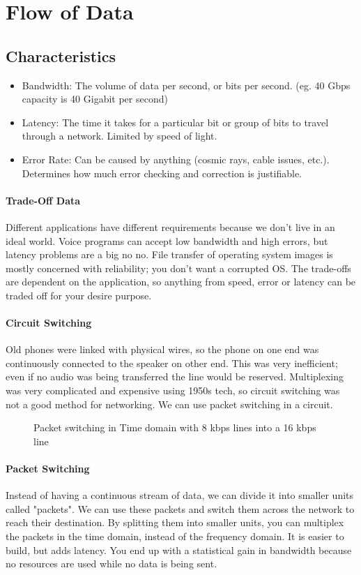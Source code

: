 \section{Flow of Data}
\subsection{Characteristics}
\begin{itemize}
	\item Bandwidth: The volume of data per second, or bits per second. (eg. 40 Gbps capacity is 40 Gigabit per second)
	\item Latency: The time it takes for a particular bit or group of bits to travel through a network. Limited by speed of light.
	\item Error Rate: Can be caused by anything (cosmic rays, cable issues, etc.). Determines how much error checking and correction is justifiable.
\end{itemize}
\paragraph{Trade-Off Data}
Different applications have different requirements because we don't live in an ideal world. Voice programs can accept low bandwidth and high errors, but latency problems are a big no no. File transfer of operating system images is mostly concerned with reliability; you don't want a corrupted OS. The trade-offs are dependent on the application, so anything from speed, error or latency can be traded off for your desire purpose.
\paragraph{Circuit Switching}
Old phones were linked with physical wires, so the phone on one end was continuously connected to the speaker on other end. This was very inefficient; even if no audio was being transferred the line would be reserved. Multiplexing was very complicated and expensive using 1950s tech, so circuit switching was not a good method for networking. We can use packet switching in a circuit.
   \begin{figure}[!htb]
	\caption{\label{fig:packetswitching} Packet switching in Time domain with 8 kbps lines into a 16 kbps line}
\end{figure}
\paragraph{Packet Switching}
Instead of having a continuous stream of data, we can divide it into smaller units called "packets". We can use these packets and switch them across the network to reach their destination. By splitting them into smaller units, you can multiplex the packets in the time domain, instead of the frequency domain. It is easier to build, but adds latency. You end up with a statistical gain in bandwidth because no resources are used while no data is being sent.
